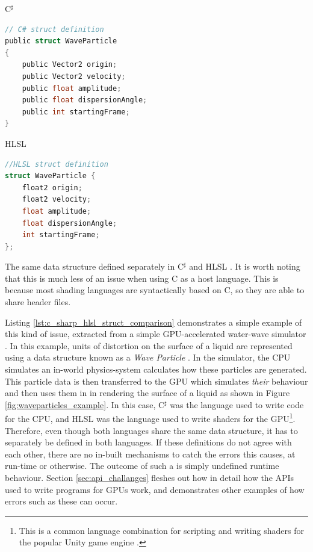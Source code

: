 \documentclass[a4paper,12pt,twoside,openright]{report}
\begin{document}
\begin{lstfloat}
\begin{center} C$^\sharp$ \end{center}
\begin{lstlisting}[language=C]
// C# struct definition
public struct WaveParticle
{
    public Vector2 origin;
    public Vector2 velocity;
    public float amplitude;
    public float dispersionAngle;
    public int startingFrame;
}
\end{lstlisting}
\begin{center} HLSL \end{center}
\begin{lstlisting}[language=C]
//HLSL struct definition
struct WaveParticle {
    float2 origin;
    float2 velocity;
    float amplitude;
    float dispersionAngle;
    int startingFrame;
};
\end{lstlisting}
\caption{The same data structure defined separately in C$^\sharp$ and HLSL
\cite{WaveParticlesGPU}. It is worth noting that this is much less of an issue
when using C as a host language. This is because most shading languages are
syntactically based on C, so they are able to share header files.}
\label{lst:c_sharp_hlsl_struct_comparison}
\end{lstfloat}

Listing \ref{lst:c_sharp_hlsl_struct_comparison} demonstrates a simple example
of this kind of issue, extracted from a simple GPU-accelerated water-wave
simulator \cite{WaveParticlesGPU}. In this example, units of distortion on the
surface of a liquid are represented using a data structure known as a
\textit{Wave Particle} \cite{WaveParticlesOriginalPaper}. In the simulator, the
CPU simulates an in-world physics-system calculates how these particles are
generated. This particle data is then transferred to the GPU which simulates
\textit{their} behaviour and then uses them in in rendering the surface of a
liquid as shown in Figure \ref{fig:waveparticles_example}. In this case,
C$^\sharp$ was the language used to write code for the CPU, and HLSL was the
language used to write shaders for the GPU\footnote{This is a common language
combination for scripting and writing shaders for the popular Unity game
engine\cite{UnityScripting} \cite{UnityShaders}.}. Therefore, even though both
languages share the same data structure, it has to separately be defined in
both languages. If these definitions do not agree with each other, there are no
in-built mechanisms to catch the errors this causes, at run-time or otherwise.
The outcome of such a is simply undefined runtime behaviour. Section
\ref{sec:api_challanges} fleshes out how in detail how the APIs used to write
programs for GPUs work, and demonstrates other examples of how errors such as
these can occur.
\end{document}
